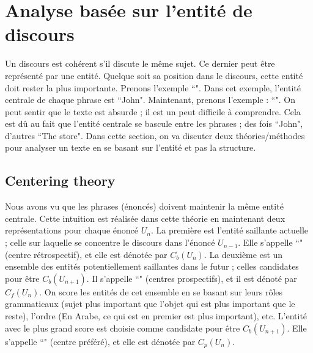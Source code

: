 \documentclass{KodeBook}
\begin{document}
\section{Analyse basée sur l'entité de discours}

Un discours est cohérent s'il discute le même sujet.
Ce dernier peut être représenté par une entité. 
Quelque soit sa position dans le discours, cette entité doit rester la plus importante.
Prenons l'exemple ``". 
Dans cet exemple, l'entité centrale de chaque phrase est ``John". 
Maintenant, prenons l'exemple : ``".
On peut sentir que le texte est absurde ; il est un peut difficile à comprendre. 
Cela est dû au fait que l'entité centrale se bascule entre les phrases ; des fois ``John", d'autres ``The store". 
Dans cette section, on va discuter deux théories/méthodes pour analyser un texte en se basant sur l'entité et pas la structure.

\subsection{Centering theory}

Nous avons vu que les phrases (énoncés) doivent maintenir la même entité centrale. 
Cette intuition est réalisée dans cette théorie en maintenant deux représentations pour chaque énoncé $U_n$.
La première est l'entité saillante actuelle ; celle sur laquelle se concentre le discours dans l'énoncé $ U_{n-1} $.
Elle s'appelle ``" (centre rétrospectif), et elle est dénotée par $C_b(U_n)$. 
La deuxième est un ensemble des entités potentiellement saillantes dans le futur ; celles candidates pour être $C_b(U_{n+1})$.
Il s'appelle ``" (centres prospectifs), et il est dénoté par $C_f(U_n)$. 
On score les entités de cet ensemble en se basant sur leurs rôles grammaticaux (sujet plus important que l'objet qui est plus important que le reste), l'ordre (En Arabe, ce qui est en premier est plus important), etc.
L'entité avec le plus grand score est choisie comme candidate pour être $C_b(U_{n+1})$.
Elle s'appelle ``" (centre préféré), et elle est dénotée par $C_p(U_n)$. 
\end{document}
